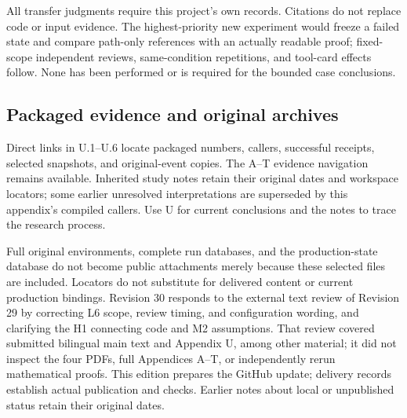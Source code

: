 All transfer judgments require this project's own records. Citations do not replace code or input evidence. The highest-priority new experiment would freeze a failed state and compare path-only references with an actually readable proof; fixed-scope independent reviews, same-condition repetitions, and tool-card effects follow. None has been performed or is required for the bounded case conclusions.

\subsection[Packaged evidence and original archives]{\texorpdfstring{\protect\hypertarget{u7}{}Packaged evidence and original archives}{Packaged evidence and original archives}}
Direct links in U.1–U.6 locate packaged numbers, callers, successful receipts, selected snapshots, and original-event copies. The A–T evidence navigation remains available. Inherited study notes retain their original dates and workspace locators; some earlier unresolved interpretations are superseded by this appendix's compiled callers. Use U for current conclusions and the notes to trace the research process.

Full original environments, complete run databases, and the production-state database do not become public attachments merely because these selected files are included. Locators do not substitute for delivered content or current production bindings. Revision 30 responds to the external text review of Revision 29 by correcting L6 scope, review timing, and configuration wording, and clarifying the H1 connecting code and M2 assumptions. That review covered submitted bilingual main text and Appendix U, among other material; it did not inspect the four PDFs, full Appendices A–T, or independently rerun mathematical proofs. This edition prepares the GitHub update; delivery records establish actual publication and checks. Earlier notes about local or unpublished status retain their original dates.

\n